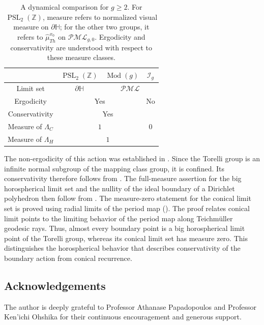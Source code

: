 \documentclass[dvipdfmx]{amsart}
\theoremstyle{remark}
\newcommand{\tmod}{\operatorname{Mod}}
\newcommand{\PThursM}{\hat{\mu}_{Th}}
\newcommand{\pml}{\mathcal{PML}}
\begin{document}
\begin{table}
\centering
\begin{tabular}{|c|c|c|c|}
\hline
& $\operatorname{PSL}_2(\mathbb{Z})$
& $\tmod(g)$
& $\mathcal{I}_g$ \\ \hline\hline
Limit set
& $\partial \mathbb{H}$
& \multicolumn{2}{c|}{$\pml$} \\
\hline
Ergodicity
& \multicolumn{2}{c|}{Yes}
& No \\ \hline
Conservativity
& \multicolumn{3}{c|}{Yes}
 \\ \hline
Measure of $\Lambda_C$
& \multicolumn{2}{c|}{$1$}
& $0$ \\ \hline
Measure of $\Lambda_H$
& \multicolumn{3}{c|}{$1$}\\ \hline
\end{tabular}
\caption{A dynamical comparison for $g\ge2$. For $\operatorname{PSL}_2(\mathbb Z)$,
measure refers to normalized visual measure on $\partial\mathbb H$;
for the other two groups, it refers to $\PThursM^{x_0}$ on $\pml_{g,0}$.
Ergodicity and conservativity are understood with respect to these
measure classes.}
\label{table:comparison}
\end{table}
The non-ergodicity of this action was established in
\cite{Miyachi2024Bounded}.
Since the Torelli group is an infinite normal subgroup of the mapping
class group, it is confined. Its conservativity therefore follows from
\cite[Theorem~1.6(1)]{choi2024confinedsubgroupsgroupscontracting}.
The full-measure assertion for the big horospherical limit set and
the nullity of the ideal boundary of a Dirichlet polyhedron then
follow from .
The measure-zero statement for the conical limit set is proved
using radial limits of the period map
().
The proof relates conical limit points to the limiting
behavior of the period map along Teichm\"uller geodesic rays.
Thus, almost every boundary point is a big horospherical limit point
of the Torelli group, whereas its conical limit set has measure zero.
This distinguishes the horospherical behavior that describes
conservativity of the boundary action from conical recurrence.

\subsection*{Acknowledgements}
The author is deeply grateful to Professor Athanase Papadopoulos and Professor Ken'ichi Ohshika for their continuous encouragement and generous support.
\end{document}
